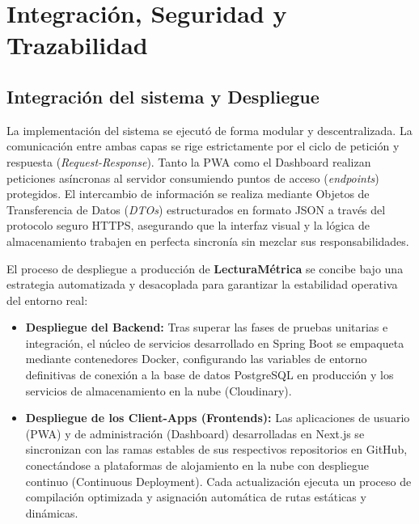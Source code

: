 \documentclass[12pt, atypical, journal]{article}
\begin{document}
\newpage

\section{Integración, Seguridad y Trazabilidad}

\subsection{Integración del sistema y Despliegue}
La implementación del sistema se ejecutó de forma modular y descentralizada. La comunicación entre ambas capas se rige estrictamente por el ciclo de petición y respuesta (\textit{Request-Response}). Tanto la PWA como el Dashboard realizan peticiones asíncronas al servidor consumiendo puntos de acceso (\textit{endpoints}) protegidos. El intercambio de información se realiza mediante Objetos de Transferencia de Datos (\textit{DTOs}) estructurados en formato JSON a través del protocolo seguro HTTPS, asegurando que la interfaz visual y la lógica de almacenamiento trabajen en perfecta sincronía sin mezclar sus responsabilidades.

El proceso de despliegue a producción de \textbf{LecturaMétrica} se concibe bajo una estrategia automatizada y desacoplada para garantizar la estabilidad operativa del entorno real:
\begin{itemize}
    \item \textbf{Despliegue del Backend:} Tras superar las fases de pruebas unitarias e integración, el núcleo de servicios desarrollado en Spring Boot se empaqueta mediante contenedores Docker, configurando las variables de entorno definitivas de conexión a la base de datos PostgreSQL en producción y los servicios de almacenamiento en la nube (Cloudinary).
    \item \textbf{Despliegue de los Client-Apps (Frontends):} Las aplicaciones de usuario (PWA) y de administración (Dashboard) desarrolladas en Next.js se sincronizan con las ramas estables de sus respectivos repositorios en GitHub, conectándose a plataformas de alojamiento en la nube con despliegue continuo (Continuous Deployment). Cada actualización ejecuta un proceso de compilación optimizada y asignación automática de rutas estáticas y dinámicas.
\end{itemize}
\end{document}

